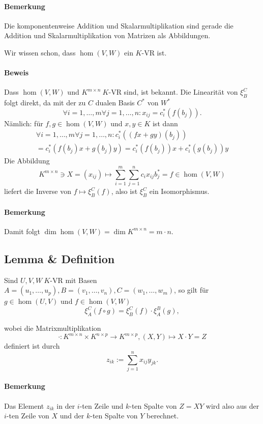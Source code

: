 \paragraph{Bemerkung}
	Die komponentenweise Addition und Skalarmultiplikation sind gerade die Addition und Skalarmultiplikation von Matrizen als Abbildungen.
	
	Wir wissen schon, dass $ \hom(V,W) $ ein $ K $-VR ist.
\paragraph{Beweis}
	Dass $ \hom(V,W) $ und $ K^{m\times n} \ K $-VR sind, ist bekannt. Die Linearität von $ \xi_B^C $ folgt direkt, da mit der zu $ C $ dualen Basis $ C^* $ von $ W^* $
		\[ \forall i=1,\dots,m\forall j=1,\dots,n:x_{ij}= c_i^*(f(b_j)). \]
	Nämlich: für $ f,g\in \hom(V,W) $ und $ x,y\in K $ ist dann
		\begin{gather*}
			\forall i= 1,\dots,m\forall j=1,\dots, n:c_i^*((fx+gy)(b_j))\\
			= c_i^*(f(b_j)x+g(b_j)y) = c_i^*(f(b_j))x+c_i^*(g(b_j))y
		\end{gather*}
	Die Abbildung
		\[ K^{m\times n}\ni X=(x_{ij})\mapsto \sum_{i=1}^{m}\sum_{j=1}^{n}c_ix_{ij}b_j^* = f\in \hom(V,W) \]
	liefert die Inverse von $ f\mapsto\xi_B^C(f) $, also ist $ \xi_B^C $ ein Isomorphismus.
\paragraph{Bemerkung}
	Damit folgt $ \dim \hom(V,W) = \dim K^{m\times n} = m\cdot n $.
\subsection{Lemma \& Definition}
	\begin{Lemma}
	Sind $ U,V,W \ K$-VR mit Basen $ A=(u_1,\dots,u_p),B=(v_1,\dots,v_n),C=(w_1,\dots,w_m) $, so gilt für $ g\in \hom(U,V) $ und $ f\in \hom(V,W) $
		\[ \xi_A^C(f\circ g) = \xi_B^C(f)\cdot \xi_A^B(g), \]
	\end{Lemma}
	\begin{Definition}
	wobei die Matrixmultiplikation
		\[ \cdot:K^{m\times n}\times K^{n\times p} \to K^{m\times p}, (X,Y)\mapsto X\cdot Y = Z \]
	definiert ist durch
		\[ z_{ik} := \sum_{j=1}^{n}x_{ij}y_{jk}. \]
	\end{Definition}
\paragraph{Bemerkung}
	Das Element $ z_{ik} $ in der $ i $-ten Zeile und $ k $-ten Spalte von $ Z = XY $ wird also aus der $ i $-ten Zeile von $ X $ und der $k$-ten Spalte von $ Y $ berechnet.
